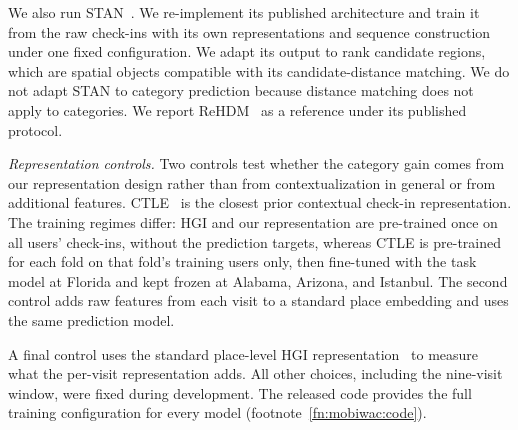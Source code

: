 We also run STAN~\cite{luo2021stan}. We re-implement its published architecture and train it from the raw check-ins with its own representations and sequence construction under one fixed configuration. We adapt its output to rank candidate regions, which are spatial objects compatible with its candidate-distance matching. We do not adapt STAN to category prediction because distance matching does not apply to categories. We report ReHDM~\cite{li2025rehdm} as a reference under its published protocol.

\emph{Representation controls.} Two controls test whether the category gain comes from our representation design rather than from contextualization in general or from additional features. CTLE~\cite{lin2021ctle} is the closest prior contextual check-in representation. The training regimes differ: HGI and our representation are pre-trained once on all users' check-ins, without the prediction targets, whereas CTLE is pre-trained for each fold on that fold's training users only, then fine-tuned with the task model at Florida and kept frozen at Alabama, Arizona, and Istanbul. The second control adds raw features from each visit to a standard place embedding and uses the same prediction model.

A final control uses the standard place-level HGI representation~\cite{huang2023hgi} to measure what the per-visit representation adds. All other choices, including the nine-visit window, were fixed during development. The released code provides the full training configuration for every model (footnote~\ref{fn:mobiwac:code}).
